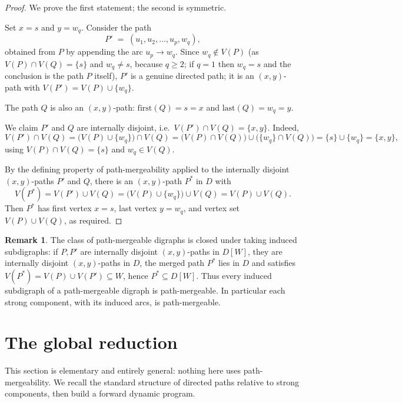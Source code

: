 \documentclass[12pt]{article}
\theoremstyle{definition}
\newtheorem{remark}{Remark}
\begin{document}
\begin{proof}
We prove the first statement; the second is symmetric.

Set $x=s$ and $y=w_{q}$. Consider the path
\[
P' \;=\; (u_{1},u_{2},\dots,u_{p},w_{q}),
\]
obtained from $P$ by appending the arc $u_{p}\to w_{q}$. Since
$w_{q}\notin V(P)$ (as $V(P)\cap V(Q)=\{s\}$ and $w_{q}\neq s$, because $q\ge 2$;
if $q=1$ then $w_{q}=s$ and the conclusion is the path $P$ itself), $P'$ is a
genuine directed path; it is an $(x,y)$-path with
$V(P')=V(P)\cup\{w_{q}\}$.

The path $Q$ is also an $(x,y)$-path: $\mathrm{first}(Q)=s=x$ and
$\mathrm{last}(Q)=w_{q}=y$.

We claim $P'$ and $Q$ are internally disjoint, i.e.\ $V(P')\cap V(Q)=\{x,y\}$.
Indeed,
\[
V(P')\cap V(Q)=\bigl(V(P)\cup\{w_{q}\}\bigr)\cap V(Q)
=\bigl(V(P)\cap V(Q)\bigr)\cup\bigl(\{w_{q}\}\cap V(Q)\bigr)
=\{s\}\cup\{w_{q}\}=\{x,y\},
\]
using $V(P)\cap V(Q)=\{s\}$ and $w_{q}\in V(Q)$.

By the defining property of path-mergeability applied to the internally disjoint
$(x,y)$-paths $P'$ and $Q$, there is an $(x,y)$-path $P^{*}$ in $D$ with
\[
V(P^{*})=V(P')\cup V(Q)=\bigl(V(P)\cup\{w_{q}\}\bigr)\cup V(Q)=V(P)\cup V(Q).
\]
Then $P^{*}$ has first vertex $x=s$, last vertex $y=w_{q}$, and vertex set
$V(P)\cup V(Q)$, as required.
\end{proof}

\begin{remark}\label{rem:closure}
The class of path-mergeable digraphs is closed under taking induced subdigraphs: if
$P,P'$ are internally disjoint $(x,y)$-paths in $D[W]$, they are internally
disjoint $(x,y)$-paths in $D$, the merged path $P^{*}$ lies in $D$ and satisfies
$V(P^{*})=V(P)\cup V(P')\subseteq W$, hence $P^{*}\subseteq D[W]$. Thus every
induced subdigraph of a path-mergeable digraph is path-mergeable. In particular
each strong component, with its induced arcs, is path-mergeable.
\end{remark}

\section{The global reduction}\label{sec:global}

This section is elementary and entirely general: nothing here uses
path-mergeability. We recall the standard structure of directed paths relative to
strong components, then build a forward dynamic program.
\end{document}
